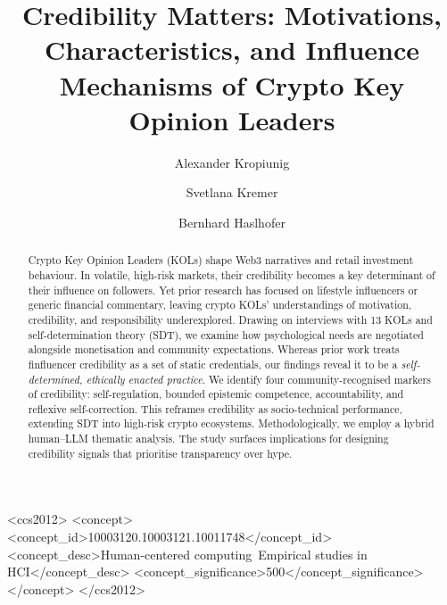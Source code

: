 \documentclass[sigconf,nonacm]{acmart}
\begin{document}
\title[Motivations, Characteristics, and Influence Mechanisms of Crypto Key Opinion Leaders]{Credibility Matters: Motivations, Characteristics, and Influence Mechanisms of Crypto Key Opinion Leaders}
\author{Alexander Kropiunig}
\author[]{Svetlana Kremer}
\author[]{Bernhard Haslhofer}


\begin{abstract}

Crypto Key Opinion Leaders (KOLs) shape Web3 narratives and retail investment behaviour. In volatile, high-risk markets, their credibility becomes a key determinant of their influence on followers. Yet prior research has focused on lifestyle influencers or generic financial commentary, leaving crypto KOLs' understandings of motivation, credibility, and responsibility underexplored. Drawing on interviews with 13 KOLs and self-determination theory (SDT), we examine how psychological needs are negotiated alongside monetisation and community expectations. Whereas prior work treats finfluencer credibility as a set of static credentials, our findings reveal it to be a \emph{self-determined, ethically enacted practice}. We identify four community-recognised markers of credibility: self-regulation, bounded epistemic competence, accountability, and reflexive self-correction. This reframes credibility as socio-technical performance, extending SDT into high-risk crypto ecosystems. Methodologically, we employ a hybrid human--LLM thematic analysis. The study surfaces implications for designing credibility signals that prioritise transparency over hype.
\end{abstract}

\begin{CCSXML}
<ccs2012>
   <concept>
       <concept_id>10003120.10003121.10011748</concept_id>
       <concept_desc>Human-centered computing~Empirical studies in HCI</concept_desc>
       <concept_significance>500</concept_significance>
       </concept>
 </ccs2012>
\end{CCSXML}
\end{document}
